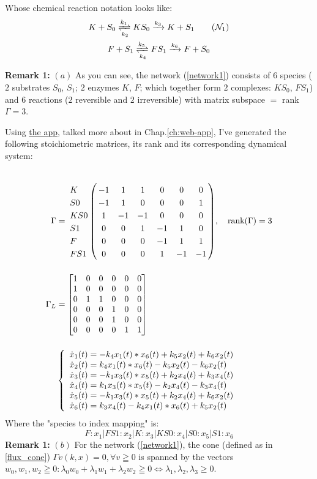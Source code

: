 Whose chemical reaction notation looks like:
\begin{gather}\label{network1}
	K + S_0 \xrightleftharpoons[k_2]{k_1} K S_0 \xrightarrow{k_3} K + S_1 \tag{$\mathcal{N}_1$} \\
	F + S_1 \xrightleftharpoons[k_4]{k_5} F S_1 \xrightarrow{k_6} F + S_0 \notag
\end{gather}

\textbf{Remark 1:} $(a)$ As you can see, the network (\ref{network1}) consists of $6$ species ($2$ substrates $S_0$, $S_1$; $2$ enzymes $K$, $F$; which together form $2$ complexes: $K S_0$, $F S_1$) and $6$ reactions ($2$ reversible and $2$ irreversible) with matrix subspace $=$ rank $\Gamma = 3$.

Using \href{https://github.com/viktorashi/Open-CoNtRol}{the app}, talked more about in Chap.\ref{ch:web-app}, I've generated the following stoichiometric matrices, its rank and its corresponding dynamical system:

\begin{align*}
	\Gamma &=
	\bordermatrix{  & \cr
		K & -1 &  1 &  1 &  0 &  0 &  0 \cr
		S0& -1 &  1 &  0 &  0 &  0 &  1 \cr
		KS0 &  1& -1& -1 &  0 &  0 &  0 \cr
		S1 &  0 &  0 &  1& -1 &  1 &  0 \cr
		F &  0 &  0 &  0& -1 &  1 &  1 \cr
		FS1 &  0 &  0 &  0 &  1& -1& -1  \cr
	}
	, \quad \text{rank}(\Gamma) = 3 \\[3ex]
	\Gamma_L &=
	\begin{bmatrix}
		1&0&0&0&0&0\\
		1&0&0&0&0&0\\
		0&1&1&0&0&0\\
		0&0&0&1&0&0\\
		0&0&0&1&0&0\\
		0&0&0&0&1&1
	\end{bmatrix} \\[3ex]
	&
	\begin{cases*}
		\begin{array}{ll}
			\dot{x}_1(t) = -k_4 x_1(t) *x_6(t)+k_5 x_2(t)+k_6 x_2(t) \\
			\dot{x}_2(t) = k_4 x_1(t) *x_6(t)-k_5 x_2(t)-k_6 x_2(t) \\
			\dot{x}_3(t) = -k_1 x_3(t) *x_5(t)+k_2 x_4(t)+k_3 x_4(t) \\
			\dot{x}_4(t) = k_1 x_3(t) *x_5(t)-k_2 x_4(t)-k_3 x_4(t) \\
			\dot{x}_5(t) = -k_1 x_3(t) *x_5(t)+k_2 x_4(t)+k_6 x_2(t) \\
			\dot{x}_6(t) = k_3 x_4(t)-k_4 x_1(t) *x_6(t)+k_5 x_2(t) \\
		\end{array}	
	\end{cases*}
\end{align*}
Where the "species to index mapping" is:
\[
	F:  x_1
 | FS1: x_2
 | K: x_3
 | KS0: x_4
 | S0: x_5
 | S1: x_6
\]
\textbf{Remark 1:} $(b)$ For the network (\ref{network1}), the cone (defined as in \ref{flux_cone}) $\Gamma v(k,x) = 0, \forall v \geqq 0$ is spanned by the vectors $w_0, w_1, w_2 \geqq 0 : \lambda_0 w_0 + \lambda_1 w_1 + \lambda_2 w_2 \geqq 0 \iff \lambda_1, \lambda_2, \lambda_3 \geq 0$.

